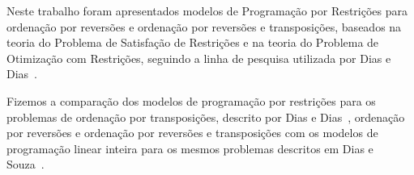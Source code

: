 Neste trabalho foram apresentados modelos de Programação por
Restrições para ordenação por reversões e ordenação por reversões e
transposições, baseados na teoria do Problema de Satisfação de
Restrições e na teoria do Problema de Otimização com Restrições,
seguindo a linha de pesquisa utilizada por Dias e
Dias~\cite{DiasDias*2009}.

Fizemos a comparação dos modelos de programação por restrições para os
problemas de ordenação por transposições, descrito por Dias e
Dias~\cite{DiasDias*2009}, ordenação por reversões e ordenação por
reversões e transposições com os modelos de programação linear inteira
para os mesmos problemas descritos em Dias e
Souza~\cite{DiasSouza*2007}.


